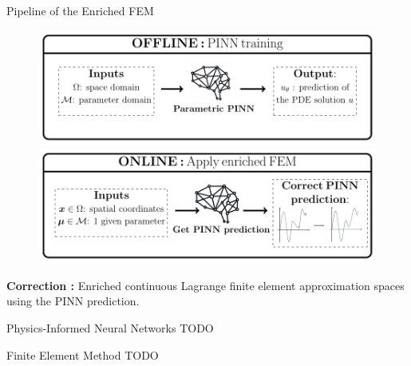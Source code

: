 \begin{frame}{Pipeline of the Enriched FEM}
	\begin{figure}[!ht]
		\centering
		\includegraphics[width=0.7\linewidth]{images/intro/pipeline/offline_v2.pdf}

		\includegraphics[width=0.7\linewidth]{images/intro/pipeline/online_v2.pdf}
	\end{figure}

	\textbf{Correction :} Enriched continuous Lagrange finite element approximation spaces
	using the PINN prediction.
\end{frame}

\begin{frame}{Physics-Informed Neural Networks}
	TODO
\end{frame}

\begin{frame}{Finite Element Method}
	TODO
\end{frame}